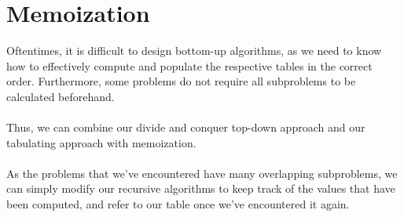\documentclass[a4paper]{article}
\begin{document}
\section{Memoization}
Oftentimes, it is difficult to design bottom-up algorithms, as we need to know how to effectively compute and populate the respective tables in the correct order. Furthermore, some problems do not require all subproblems to be calculated beforehand.\\ \\
Thus, we can combine our divide and conquer top-down approach and our tabulating approach with memoization.\\ \\
As the problems that we've encountered have many overlapping subproblems, we can simply modify our recursive algorithms to keep track of the values that have been computed, and refer to our table once we've encountered it again.\\ \\
\end{document}
